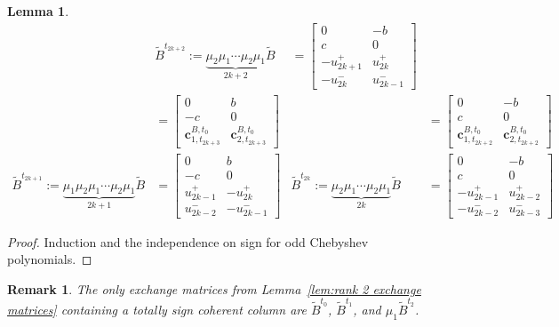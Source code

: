 \documentclass{amsart}
\newtheorem{lemma}[theorem]{Lemma}
\newtheorem{remark}[theorem]{Remark}
\numberwithin{theorem}{section}
\newcommand{\bfc}{\boldsymbol{c}}
\begin{document}
\begin{lemma}
\begin{align*}
      &
      \tilde B^{t_{2k+2}}:=\underbrace{\mu_2\mu_1\cdots\mu_2\mu_1}_{2k+2}\tilde B 
      &= 
      \left[\begin{array}{cc} 0 & -b \\ c & 0\\ -u^+_{2k+1} & u^+_{2k}\\ -u^-_{2k} & u^-_{2k-1}\end{array}\right]\\
      &= 
      \left[\begin{array}{cc} 0 & b \\ -c & 0\\ \bfc^{B,t_0}_{1,t_{2k+3}} & \bfc^{B,t_0}_{2,t_{2k+3}}\end{array}\right]
      &
      &= 
      \left[\begin{array}{cc} 0 & -b \\ c & 0\\ \bfc^{B,t_0}_{1,t_{2k+2}} & \bfc^{B,t_0}_{2,t_{2k+2}}\end{array}\right]\\
      \tilde B^{t_{2k+1}}:=\underbrace{\mu_1\mu_2\mu_1\cdots\mu_2\mu_1}_{2k+1}\tilde B 
      &= 
      \left[\begin{array}{cc} 0 & b \\ -c & 0\\ u^+_{2k-1} & -u^+_{2k}\\ u^-_{2k-2} & -u^-_{2k-1}\end{array}\right]
      &
      \tilde B^{t_{2k}}:=\underbrace{\mu_2\mu_1\cdots\mu_2\mu_1}_{2k}\tilde B 
      &= 
      \left[\begin{array}{cc} 0 & -b \\ c & 0\\ -u^+_{2k-1} & u^+_{2k-2}\\ -u^-_{2k-2} & u^-_{2k-3}\end{array}\right]
    \end{align*}
  \end{lemma}
  \begin{proof}
    Induction and the independence on sign for odd Chebyshev polynomials.
  \end{proof}

  \begin{remark}
    \label{rem:sign coherence}
    The only exchange matrices from Lemma~\ref{lem:rank 2 exchange matrices} containing a totally sign coherent column are $\tilde B^{t_0}$, $\tilde B^{t_1}$, and $\mu_1\tilde B^{t_2}$.
  \end{remark}
\end{document}
